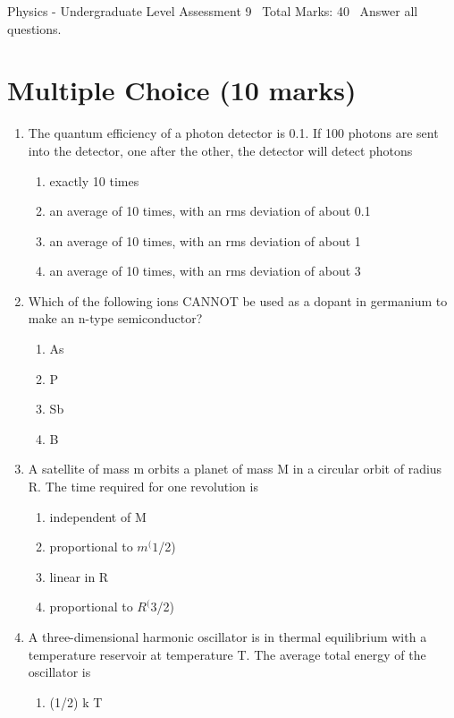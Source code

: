 \documentclass[12pt]{article}
\begin{document}
\begin{center}
Physics - Undergraduate Level Assessment 9 \
Total Marks: 40 \
Answer all questions.
\end{center}

\section*{Multiple Choice (10 marks)}
\begin{enumerate}[label=\arabic*.]
\item The quantum efficiency of a photon detector is 0.1. If 100 photons are sent into the detector, one after the other, the detector will detect photons
\begin{enumerate}[label=(\alph*)]
    \item exactly 10 times
    \item an average of 10 times, with an rms deviation of about 0.1
    \item an average of 10 times, with an rms deviation of about 1
    \item an average of 10 times, with an rms deviation of about 3
\end{enumerate}
\item Which of the following ions CANNOT be used as a dopant in germanium to make an n-type semiconductor?
\begin{enumerate}[label=(\alph*)]
    \item As
    \item P
    \item Sb
    \item B
\end{enumerate}
\item A satellite of mass m orbits a planet of mass M in a circular orbit of radius R. The time required for one revolution is
\begin{enumerate}[label=(\alph*)]
    \item independent of M
    \item proportional to $m^(1$/2)
    \item linear in R
    \item proportional to $R^(3$/2)
\end{enumerate}
\item A three-dimensional harmonic oscillator is in thermal equilibrium with a temperature reservoir at temperature T. The average total energy of the oscillator is
\begin{enumerate}[label=(\alph*)]
    \item (1/2) k T

\end{enumerate}
\end{enumerate}
\end{document}
